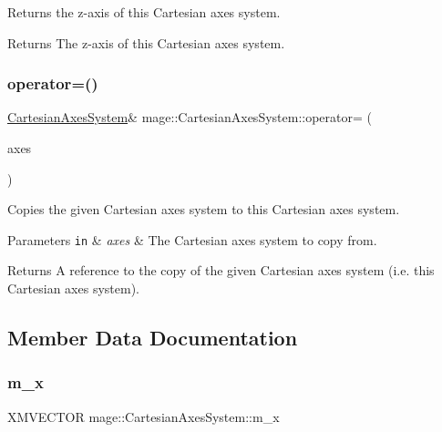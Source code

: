 Returns the z-\/axis of this Cartesian axes system.

\begin{DoxyReturn}{Returns}
The z-\/axis of this Cartesian axes system. 
\end{DoxyReturn}
\hypertarget{structmage_1_1_cartesian_axes_system_ad86c9b070b23e4ba1a6bc0543d1189bc}{}\label{structmage_1_1_cartesian_axes_system_ad86c9b070b23e4ba1a6bc0543d1189bc} 
\subsubsection{\texorpdfstring{operator=()}{operator=()}}
{\footnotesize\ttfamily \hyperlink{structmage_1_1_cartesian_axes_system}{Cartesian\+Axes\+System}\& mage\+::\+Cartesian\+Axes\+System\+::operator= (\begin{DoxyParamCaption}\item[{const \hyperlink{structmage_1_1_cartesian_axes_system}{Cartesian\+Axes\+System} \&}]{axes }\end{DoxyParamCaption})}

Copies the given Cartesian axes system to this Cartesian axes system.


\begin{DoxyParams}[1]{Parameters}
\mbox{\tt in}  & {\em axes} & The Cartesian axes system to copy from. \\
\hline
\end{DoxyParams}
\begin{DoxyReturn}{Returns}
A reference to the copy of the given Cartesian axes system (i.\+e. this Cartesian axes system). 
\end{DoxyReturn}


\subsection{Member Data Documentation}
\hypertarget{structmage_1_1_cartesian_axes_system_aa840c10ca92782e8c87c1ab53f0b86e9}{}\label{structmage_1_1_cartesian_axes_system_aa840c10ca92782e8c87c1ab53f0b86e9} 
\subsubsection{\texorpdfstring{m\+\_\+x}{m\_x}}
{\footnotesize\ttfamily X\+M\+V\+E\+C\+T\+OR mage\+::\+Cartesian\+Axes\+System\+::m\+\_\+x\hspace{0.3cm}{\ttfamily [private]}}

